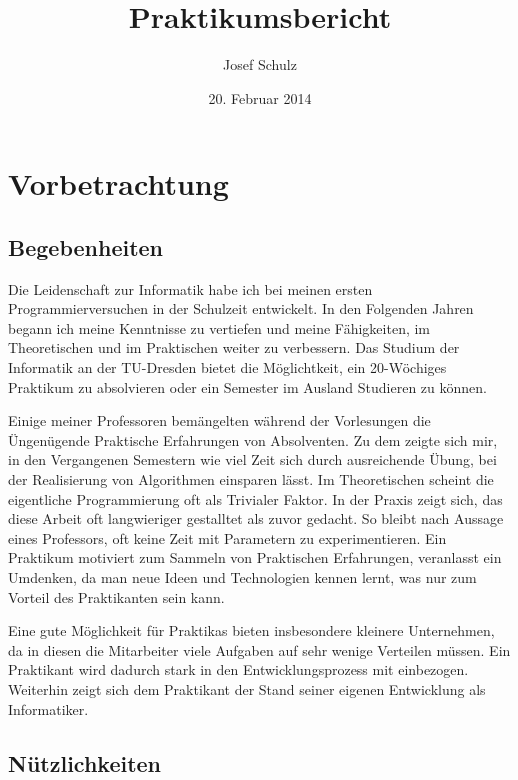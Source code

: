 \documentclass{scrartcl}
\title{Praktikumsbericht}
\author{Josef Schulz}
\date{20. Februar 2014}
\begin{document}
 
\maketitle

\newpage

\tableofcontents

\newpage

\section{Vorbetrachtung}

\subsection{Begebenheiten}

Die Leidenschaft zur Informatik habe ich bei meinen ersten Programmierversuchen in der Schulzeit entwickelt.
In den Folgenden Jahren begann ich meine Kenntnisse zu vertiefen und meine Fähigkeiten, im Theoretischen
und im Praktischen weiter zu verbessern. Das Studium der Informatik an der TU-Dresden bietet die Möglichtkeit,
ein 20-Wöchiges Praktikum zu absolvieren oder ein Semester im Ausland Studieren zu können.

Einige meiner Professoren bemängelten während der Vorlesungen die Üngenügende Praktische Erfahrungen von
Absolventen. Zu dem zeigte sich mir, in den Vergangenen Semestern wie viel Zeit sich durch ausreichende Übung,
bei der Realisierung von Algorithmen einsparen lässt. Im Theoretischen scheint die eigentliche Programmierung
oft als Trivialer Faktor. In der Praxis zeigt sich, das diese Arbeit oft langwieriger gestalltet als zuvor
gedacht. So bleibt nach Aussage eines Professors, oft keine Zeit mit Parametern zu experimentieren.
Ein Praktikum motiviert zum Sammeln von Praktischen Erfahrungen, veranlasst ein Umdenken, da man neue Ideen und
Technologien kennen lernt, was nur zum Vorteil des Praktikanten sein kann.

Eine gute Möglichkeit für Praktikas bieten insbesondere kleinere Unternehmen, da in diesen die Mitarbeiter
viele Aufgaben auf sehr wenige Verteilen müssen. Ein Praktikant wird dadurch stark in den Entwicklungsprozess
mit einbezogen. Weiterhin zeigt sich dem Praktikant der Stand seiner eigenen Entwicklung als Informatiker.

\subsection{Nützlichkeiten}
\end{document}
